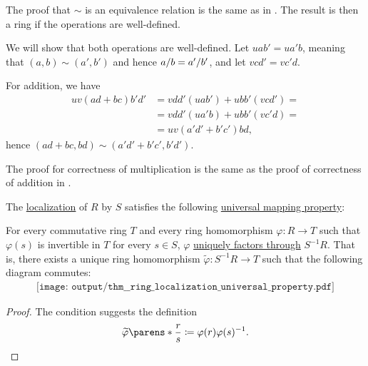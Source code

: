 \begin{defproof}
  The proof that \( {\sim} \) is an equivalence relation is the same as in . The result is then a ring if the operations are well-defined.

  We will show that both operations are well-defined. Let \( u ab' = u a'b \), meaning that \( (a, b) \sim (a', b') \) and hence \( a / b = a' / b' \), and let \( v cd' = v c'd \).

  For addition, we have
  \begin{align*}
    u v (ad + bc) b' d'
    &=
    v dd' (u ab') + u bb' (v cd')
    = \\ &=
    v dd' (u a'b) + u bb' (v c'd)
    = \\ &=
    u v (a'd' + b'c') b d,
  \end{align*}
  hence \( (ad + bc, bd) \sim (a'd' + b'c', b'd') \).

  The proof for correctness of multiplication is the same as the proof of correctness of addition in .
\end{defproof}

\begin{proposition}\label{thm:ring_localization_universal_property}
  The \hyperref[def:ring_localization]{localization} of \( R \) by \( S \) satisfies the following \hyperref[rem:universal_mapping_property]{universal mapping property}:
  \begin{displayquote}
    For every commutative ring \( T \) and every ring homomorphism \( \varphi: R \to T \) such that \( \varphi(s) \) is invertible in \( T \) for every \( s \in S \), \( \varphi \) \hyperref[def:factors_through]{uniquely factors through} \( S^{-1} R \). That is, there exists a unique ring homomorphism \( \widetilde{\varphi}: S^{-1} R \to T \) such that the following diagram commutes:
    \begin{equation}\label{eq:thm:ring_localization_universal_property/diagram}
      \begin{aligned}
        \texttt{[image: output/thm\_\_ring\_localization\_universal\_property.pdf]}
      \end{aligned}
    \end{equation}
  \end{displayquote}
\end{proposition}
\begin{proof}
  The condition suggests the definition
  \begin{equation*}
    \widetilde{\varphi}\parens*{ \frac r s } \coloneqq \varphi(r) \varphi(s)^{-1}.
  \end{equation*}
\end{proof}

